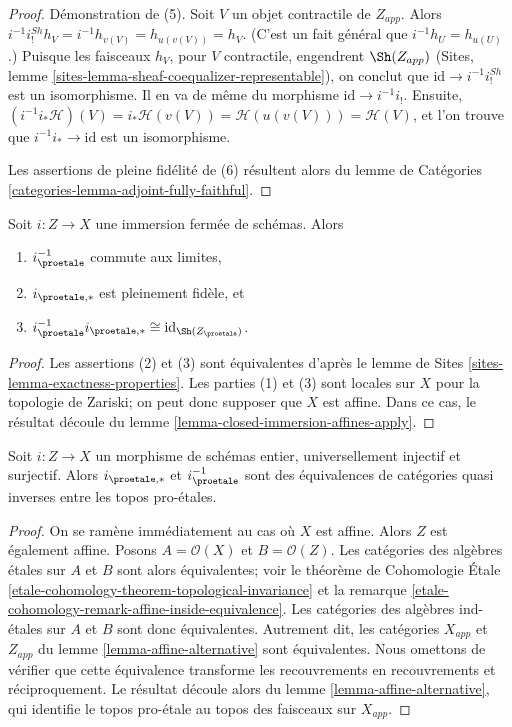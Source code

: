 \begin{proof}
\medskip\noindent
Démonstration de (5). Soit $V$ un objet contractile de $Z_{app}$.
Alors $i^{-1}i^{Sh}_!h_V = i^{-1}h_{v(V)} = h_{u(v(V))} = h_V$.
(C'est un fait général que $i^{-1}h_U = h_{u(U)}$.) Puisque les
faisceaux $h_V$, pour $V$ contractile, engendrent $\Sh(Z_{app})$
(Sites, lemme \ref{sites-lemma-sheaf-coequalizer-representable}),
on conclut que $\text{id} \to i^{-1}i^{Sh}_!$ est un isomorphisme.
Il en va de même du morphisme $\text{id} \to i^{-1}i_!$. Ensuite,
$(i^{-1}i_*\mathcal{H})(V) = i_*\mathcal{H}(v(V)) =
\mathcal{H}(u(v(V))) = \mathcal{H}(V)$, et l'on trouve que
$i^{-1}i_* \to \text{id}$ est un isomorphisme.

\medskip\noindent
Les assertions de pleine fidélité de (6) résultent alors du
lemme de Catégories \ref{categories-lemma-adjoint-fully-faithful}.
\end{proof}

\begin{lemma}
\label{lemma-closed-immersion}
Soit $i : Z \to X$ une immersion fermée de schémas. Alors
\begin{enumerate}
\item $i_\proetale^{-1}$ commute aux limites,
\item $i_{\proetale, *}$ est pleinement fidèle, et
\item $i_\proetale^{-1}i_{\proetale, *} \cong \text{id}_{\Sh(Z_\proetale)}$.
\end{enumerate}
\end{lemma}

\begin{proof}
Les assertions (2) et (3) sont équivalentes d'après le
lemme de Sites \ref{sites-lemma-exactness-properties}.
Les parties (1) et (3) sont locales sur $X$ pour la topologie de Zariski; on peut donc supposer que
$X$ est affine. Dans ce cas, le résultat découle du
lemme \ref{lemma-closed-immersion-affines-apply}.
\end{proof}

\begin{lemma}
\label{lemma-thickening}
Soit $i : Z \to X$ un morphisme de schémas entier, universellement injectif et surjectif.
Alors
$i_{\proetale, *}$ et $i_\proetale^{-1}$ sont des équivalences de catégories
quasi inverses entre les topos pro-\'etales.
\end{lemma}

\begin{proof}
On se ramène immédiatement au cas où $X$ est affine.
Alors $Z$ est également affine. Posons $A = \mathcal{O}(X)$ et $B = \mathcal{O}(Z)$.
Les catégories des algèbres \'etales sur
$A$ et $B$ sont alors équivalentes; voir 
le théorème de Cohomologie \'Etale
\ref{etale-cohomology-theorem-topological-invariance} et la
remarque \ref{etale-cohomology-remark-affine-inside-equivalence}.
Les catégories des algèbres ind-\'etales sur $A$ et $B$ sont donc
équivalentes. Autrement dit, les catégories $X_{app}$ et $Z_{app}$
du lemme \ref{lemma-affine-alternative} sont équivalentes.
Nous omettons de vérifier
que cette équivalence transforme les recouvrements en recouvrements et réciproquement.
Le résultat découle alors du lemme \ref{lemma-affine-alternative},
qui identifie le topos pro-\'etale au topos des faisceaux sur $X_{app}$.
\end{proof}


